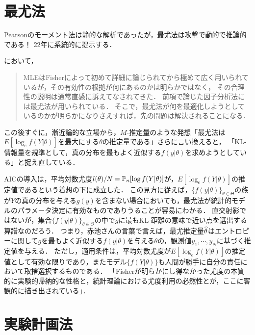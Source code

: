 \documentclass[uplatex,dvipdfmx]{jsreport}
\begin{document}
\section{最尤法}

\begin{tcolorbox}[colframe=ForestGreen, colback=ForestGreen!10!white,breakable,colbacktitle=ForestGreen!40!white,coltitle=black,fonttitle=\bfseries\sffamily,
title=]
    Pearsonのモーメント法は静的な解析であったが，最尤法は攻撃で動的で推論的である！
    22年\cite{Fisher22}に系統的に提示する．
\end{tcolorbox}

\begin{history}[赤池さんはFisherの超克を意識していた]
    \cite{Akaike76}において，
    \begin{quote}
        MLEはFisherによって初めて詳細に論じられてから極めて広く用いられているが，その有効性の根拠が何にあるのかは明らかではなく，
        その合理性の説明は通常直感に訴えてなされてきた．
        前項で論じた因子分析法には最尤法が用いられている．
        そこで，最尤法が何を最適化しようとしているのかが明らかになりさえすれば，先の問題は解決されることになる．
    \end{quote}
    この後すぐに，漸近論的な立場から，$M$-推定量のような発想「最尤法は$E[\log_ef(Y|\theta)]$を最大にする$\theta$の推定量である」さらに言い換えると，
    「KL-情報量を規準として，真の分布を最もよく近似する$f(y|\theta)$を求めようとしている」と捉え直している．

    AICの導入は，平均対数尤度$l(\theta)/N=\mathbb{P}_n[\log f(Y|\theta)]$が，$E[\log_ef(Y|\theta)]$の推定値であるという着想の下に成立した．
    この見方に従えば，$\{f(y|\theta)\}_{\theta\in\Theta}$の族が$Y$の真の分布を与える$g(y)$を含まない場合においても，最尤法が統計的モデルのパラメータ決定に有効なものでありうることが容易にわかる．
    直交射影ではないが，集合$\{f(y|\theta)\}_{\theta\in\Theta}$の中で$g$に最もKL-距離の意味で近い点を選出する算譜なのだろう．
    つまり，赤池さんの言葉で言えば，最尤推定量$\widehat{\theta}$はエントロピーに関して$g$を最もよく近似する$f(y|\theta)$を与える$\theta$の，観測値$y_1,\cdots,y_N$に基づく推定値を与える．
    ただし，適用条件は，平均対数尤度が$E[\log_ef(Y|\theta)]$の推定値として有効な限りであり，またモデル$\{f(Y|\theta)\}$も人間が勝手に自分の責任において取捨選択するものである．
    「Fisherが明らかにし得なかった尤度の本質的に実験的帰納的な性格と，統計理論における尤度利用の必然性とが，ここに客観的に描き出されている」．
\end{history}

\section{実験計画法}
\end{document}
